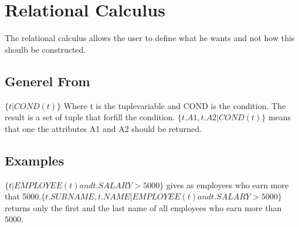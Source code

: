 \section{Relational Calculus} 
The relational calculus allows the user to define what he wants and not how this
shoulb be constructed.
\subsection{Generel From}
$\{t|COND(t)\}$ Where t is the tuplevariable and COND is the condition. The result
is a set of tuple that forfill the condition.\newline
$\{t.A1,t.A2|COND(t)\}$ means that one the attributes A1 and A2 should be returned.

\subsection{Examples}
$\{t|EMPLOYEE(t) and t.SALARY>5000\}$ gives as employees who earn more that
5000.\newline $\{t.SURNAME,t.NAME|EMPLOYEE(t) and t.SALARY > 5000\}$ returns
only the first and the last name of all employees who earn more than 5000.
